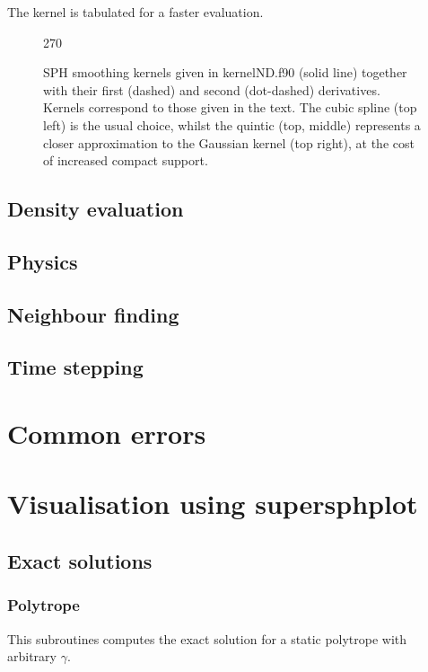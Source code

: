 \documentclass[a4paper,12pt]{article}
\begin{document}
 The kernel is tabulated for a faster evaluation. 

\begin{figure}[h]
\begin{center}
\begin{turn}{270}\end{turn}
\caption{SPH smoothing kernels given in kernelND.f90 (solid
line) together with their first (dashed) and second (dot-dashed) derivatives. Kernels
correspond to those given in the text. The cubic spline (top left) is the usual
choice, whilst the quintic (top, middle) represents a closer approximation to the Gaussian
kernel (top right), at the cost of increased compact support.}
\label{fig:kernels}
\end{center}
\end{figure}

\subsection{Density evaluation}

\subsection{Physics}

\subsection{Neighbour finding}

\subsection{Time stepping}

\section{Common errors}

\section{Visualisation using supersphplot}

\subsection{Exact solutions}
\subsubsection{Polytrope}
 This subroutines computes the exact solution for a static polytrope with
arbitrary $\gamma$.
\end{document}
